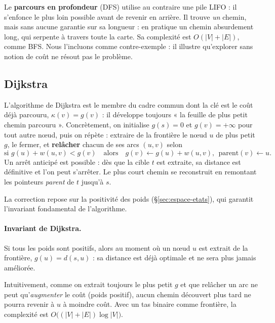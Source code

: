 \medskip

Le \textbf{parcours en profondeur} (DFS) utilise au contraire une pile LIFO : il
s'enfonce le plus loin possible avant de revenir en arrière. Il trouve \emph{un}
chemin, mais sans aucune garantie sur sa longueur : en pratique un chemin
absurdement long, qui serpente à travers toute la carte. Sa complexité est
$O(|V| + |E|)$, comme BFS. Nous l'incluons comme contre-exemple : il illustre
qu'explorer sans notion de coût ne résout pas le problème.

\subsection{Dijkstra}
\label{sec:dijkstra}

L'algorithme de Dijkstra \citep{dijkstra1959} est le membre du cadre commun dont
la clé est le coût déjà parcouru, $\kappa(v) = g(v)$ : il développe toujours
« la feuille de plus petit chemin parcouru ». Concrètement, on initialise
$g(s) = 0$ et $g(v) = +\infty$ pour tout autre nœud, puis on répète : extraire de
la frontière le nœud $u$ de plus petit $g$, le fermer, et \textbf{relâcher}
chacun de ses arcs $(u,v)$ selon
\[
  \text{si } g(u) + w(u,v) < g(v)
  \quad\text{alors}\quad
  g(v) \gets g(u) + w(u,v),\ \ \text{parent}(v) \gets u .
\]
Un arrêt anticipé est possible : dès que la cible $t$ est extraite, sa distance
est définitive et l'on peut s'arrêter. Le plus court chemin se reconstruit en
remontant les pointeurs \emph{parent} de $t$ jusqu'à $s$.

\medskip

La correction repose sur la positivité des poids (\S\ref{sec:espace-etats}), qui
garantit l'invariant fondamental de l'algorithme.

\paragraph{Invariant de Dijkstra.}
Si tous les poids sont positifs, alors au moment où un nœud $u$ est extrait de la
frontière, $g(u) = d(s,u)$ : sa distance est déjà optimale et ne sera plus jamais
améliorée.

\medskip

Intuitivement, comme on extrait toujours le plus petit $g$ et que relâcher un arc
ne peut qu'\emph{augmenter} le coût (poids positif), aucun chemin découvert plus
tard ne pourra revenir à $u$ à moindre coût. Avec un tas binaire comme frontière,
la complexité est $O\big((|V| + |E|)\log |V|\big)$.


